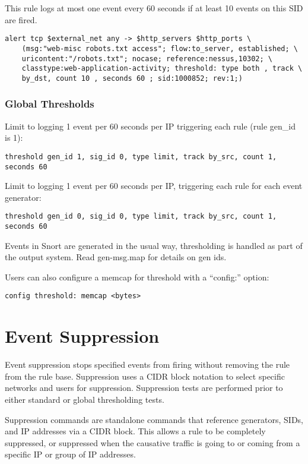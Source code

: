 \documentclass[english]{report}
\begin{document}
This rule logs at most one event every 60 seconds if at least 10 events on this SID are fired.

\begin{verbatim}
alert tcp $external_net any -> $http_servers $http_ports \
    (msg:"web-misc robots.txt access"; flow:to_server, established; \
    uricontent:"/robots.txt"; nocase; reference:nessus,10302; \
    classtype:web-application-activity; threshold: type both , track \
    by_dst, count 10 , seconds 60 ; sid:1000852; rev:1;)
\end{verbatim}

\subsubsection{Global Thresholds}

Limit to logging 1 event per 60 seconds per IP triggering each rule (rule gen\_id is 1):
\begin{verbatim}
threshold gen_id 1, sig_id 0, type limit, track by_src, count 1, seconds 60
\end{verbatim}

Limit to logging 1 event per 60 seconds per IP, triggering each rule for each event generator:
\begin{verbatim}
threshold gen_id 0, sig_id 0, type limit, track by_src, count 1, seconds 60
\end{verbatim}

Events in Snort are generated in the usual way, thresholding is handled as part
of the output system. Read gen-msg.map for details on gen ids.

Users can also configure a memcap for threshold with a ``config:'' option:

\begin{verbatim}
config threshold: memcap <bytes>
\end{verbatim}

\clearpage
\section{Event Suppression}
Event suppression stops specified events from firing without removing the rule
from the rule base. Suppression uses a CIDR block notation to select specific
networks and users for suppression.  Suppression tests are performed prior to
either standard or global thresholding tests.

Suppression commands are standalone commands that reference generators, SIDs,
and IP addresses via a CIDR block. This allows a rule to be completely
suppressed, or suppressed when the causative traffic is going to or coming
from a specific IP or group of IP addresses.
\end{document}

